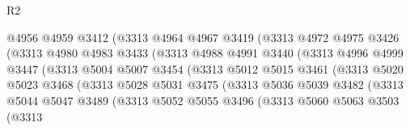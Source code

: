 \begin{lexlean}{R2}
\begin{coremodule}
                            @4956
                            @4959
                            @3412
                            (@3313
                              @4964
                              @4967
                              @3419
                              (@3313
                                @4972
                                @4975
                                @3426
                                (@3313
                                  @4980
                                  @4983
                                  @3433
                                  (@3313
                                    @4988
                                    @4991
                                    @3440
                                    (@3313
                                      @4996
                                      @4999
                                      @3447
                                      (@3313
                                        @5004
                                        @5007
                                        @3454
                                        (@3313
                                          @5012
                                          @5015
                                          @3461
                                          (@3313
                                            @5020
                                            @5023
                                            @3468
                                            (@3313
                                              @5028
                                              @5031
                                              @3475
                                              (@3313
                                                @5036
                                                @5039
                                                @3482
                                                (@3313
                                                  @5044
                                                  @5047
                                                  @3489
                                                  (@3313
                                                    @5052
                                                    @5055
                                                    @3496
                                                    (@3313
                                                      @5060
                                                      @5063
                                                      @3503
                                                      (@3313

\end{coremodule}
\end{lexlean}

